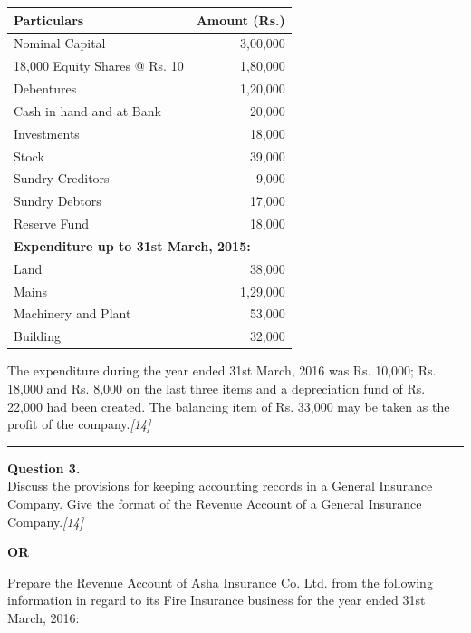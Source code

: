 \documentclass[11pt,a4paper]{article}
\newcommand{\pts}[1]{\hfill   \textit{[#1]}}
\begin{document}
\begin{center}
\small

\begin{tabular}{|l|r|}
\hline
   \textbf{Particulars} &   \textbf{Amount (Rs.)} \\
\hline
Nominal Capital & 3,00,000 \\
18,000 Equity Shares @ Rs. 10 & 1,80,000 \\
Debentures & 1,20,000 \\
Cash in hand and at Bank & 20,000 \\
Investments & 18,000 \\
Stock & 39,000 \\
Sundry Creditors & 9,000 \\
Sundry Debtors & 17,000 \\
Reserve Fund & 18,000 \\
\hline
\multicolumn{2}{|l|}{   \textbf{Expenditure up to 31st March, 2015:}} \\
\hline
Land & 38,000 \\
Mains & 1,29,000 \\
Machinery and Plant & 53,000 \\
Building & 32,000 \\
\hline
\end{tabular}
\end{center}

The expenditure during the year ended 31st March, 2016 was Rs. 10,000; Rs. 18,000 and Rs. 8,000 on the last three items and a depreciation fund of Rs. 22,000 had been created. The balancing item of Rs. 33,000 may be taken as the profit of the company.\pts{14}

\medskip\rule{\linewidth}{0.2pt}

\pagebreak




\noindent   \textbf{Question 3.} \\
Discuss the provisions for keeping accounting records in a General Insurance Company. Give the format of the Revenue Account of a General Insurance Company.\pts{14}

\centerline{   \textbf{OR}}

Prepare the Revenue Account of Asha Insurance Co. Ltd. from the following information in regard to its Fire Insurance business for the year ended 31st March, 2016:
\end{document}
